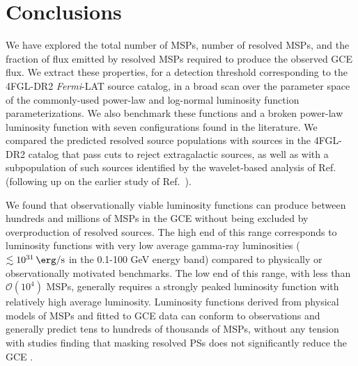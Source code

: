 \documentclass[letter,11pt]{article}
\begin{document}
\section{Conclusions}
\label{sec:conclusion}
We have explored the total number of MSPs, number of resolved MSPs, and the fraction of flux emitted by resolved MSPs required to produce the observed GCE flux. We extract these properties, for a detection threshold corresponding to the 4FGL-DR2 \textit{Fermi}-LAT source catalog, in a broad scan over the parameter space of the commonly-used power-law and log-normal luminosity function parameterizations. We also benchmark these functions and a broken power-law luminosity function with seven configurations found in the literature. We compared the predicted resolved source populations with sources in the 4FGL-DR2 catalog that pass cuts to reject extragalactic sources, as well as with a subpopulation of such sources identified by the wavelet-based analysis of Ref.~\cite{Zhong:2019ycb} (following up on the earlier study of Ref.~\cite{Bartels:2015aea}).

We found that observationally viable luminosity functions can produce between hundreds and millions of MSPs in the GCE without being excluded by overproduction of resolved sources. The high end of this range corresponds to luminosity functions with very low average gamma-ray luminosities ($\lesssim \SI{e31}{\erg\per\second}$ in the 0.1-100 GeV energy band) compared to physically or observationally motivated benchmarks. The low end of this range, with less than $\mathcal{O}(10^4)$ MSPs, generally requires a strongly peaked luminosity function with relatively high average luminosity. Luminosity functions derived from physical models of MSPs and fitted to GCE data can conform to observations and generally predict tens to hundreds of thousands of MSPs, without any tension with studies finding that masking resolved PSs does not significantly reduce the GCE \cite{Zhong:2019ycb}.
\end{document}
